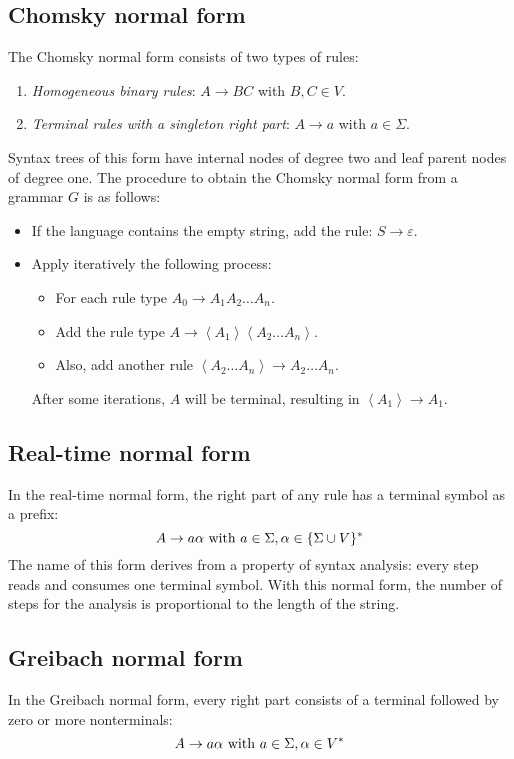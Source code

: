 \subsection{Chomsky normal form}
The Chomsky normal form consists of two types of rules:
\begin{enumerate}
    \item \textit{Homogeneous binary rules}: $A \rightarrow BC$ with $B,C \in V$.
    \item \textit{Terminal rules with a singleton right part}: $A \rightarrow a$ with $a \in \Sigma$.
\end{enumerate}
Syntax trees of this form have internal nodes of degree two and leaf parent nodes of degree one. 
The procedure to obtain the Chomsky normal form from a grammar $G$ is as follows:
\begin{itemize}
    \item If the language contains the empty string, add the rule: $S \rightarrow \varepsilon$.
    \item  Apply iteratively the following process:
        \begin{itemize}
            \item For each rule type $A_0 \rightarrow A_1A_2\dots A_n$.
            \item Add the rule type $A \rightarrow \left\langle A_1 \right\rangle\left\langle A_2\dots A_n\right\rangle$.
            \item Also, add another rule $\left\langle A_2\dots A_n\right\rangle \rightarrow A_2\dots A_n$.
        \end{itemize}
        After some iterations, $A$ will be terminal, resulting in $\left\langle A_1 \right\rangle \rightarrow A_1$.
\end{itemize}

\subsection{Real-time normal form}
In the real-time normal form, the right part of any rule has a terminal symbol as a prefix:
\[A \rightarrow a \alpha \textnormal{ with } a \in \Sigma, \alpha \in \{\Sigma \cup V\}^{*}\]
The name of this form derives from a property of syntax analysis: every step reads and consumes one terminal symbol. 
With this normal form, the number of steps for the analysis is proportional to the length of the string.

\subsection{Greibach normal form}
In the Greibach normal form, every right part consists of a terminal followed by zero or more nonterminals:
\[A \rightarrow a \alpha \textnormal{ with } a \in \Sigma, \alpha \in V^{*}\]